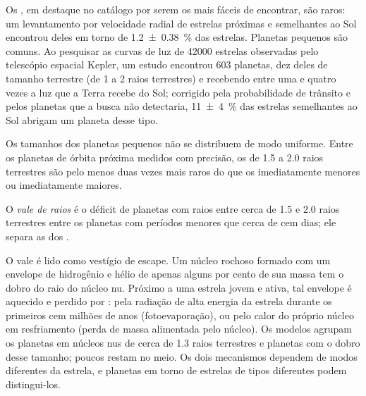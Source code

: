 Os , em destaque no catálogo por serem os mais fáceis de
encontrar, são raros: um levantamento por velocidade radial de estrelas próximas e semelhantes ao Sol encontrou
deles em torno de \qty[separate-uncertainty=true]{1.2 \pm 0.38}{\percent} das estrelas. Planetas pequenos são
comuns. Ao pesquisar as curvas de luz de \num{42000} estrelas observadas pelo
telescópio espacial Kepler, um estudo encontrou 603 planetas, dez deles de tamanho terrestre (de 1 a 2
raios terrestres) e recebendo entre uma e quatro vezes a luz que a Terra
recebe do Sol; corrigido pela probabilidade de trânsito e pelos planetas que a
busca não detectaria, \qty[separate-uncertainty=true]{11 \pm 4}{\percent} das estrelas semelhantes ao Sol abrigam
um planeta desse tipo.

Os tamanhos dos planetas pequenos não se distribuem de modo uniforme. Entre os planetas de órbita próxima
medidos com precisão, os de 1.5 a 2.0 raios terrestres são pelo menos duas vezes
mais raros do que os imediatamente menores ou imediatamente maiores.

\begin{definition}\label{def:b3:exoplanets:radius-valley}
O \emph{vale de raios} é o déficit de planetas
com raios entre cerca de 1.5 e 2.0 raios terrestres entre os planetas com
períodos menores que cerca de cem dias; ele separa as 
dos .
\end{definition}

O vale é lido como vestígio de escape. Um núcleo rochoso formado com um
envelope de hidrogênio e hélio de apenas alguns por cento de sua massa tem o dobro
do raio do núcleo nu. Próximo a uma estrela jovem e ativa, tal
envelope é aquecido e perdido por : pela
radiação de alta energia da estrela durante os primeiros cem milhões de anos
(fotoevaporação), ou pelo calor do próprio núcleo em resfriamento (perda de massa
alimentada pelo núcleo). Os modelos agrupam os planetas em núcleos nus de cerca de 1.3
raios terrestres e planetas com o dobro desse tamanho; poucos restam no meio. Os dois
mecanismos dependem de modos diferentes da estrela, e planetas em torno de estrelas de
tipos diferentes podem distingui-los.

